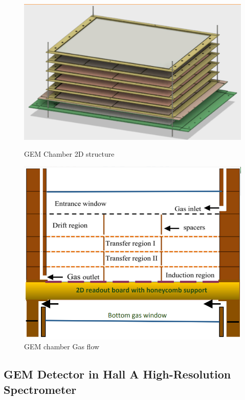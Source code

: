 \begin{figure}[!tbp]
  \centering
  \begin{minipage}[b]{0.45\textwidth}
    \includegraphics[width=\textwidth]{images/chap5/gem_structure_3d.png}
    \caption{GEM Chamber 2D structure}
  \end{minipage}
  \hfill
  \begin{minipage}[b]{0.45\textwidth}
    \includegraphics[width=\textwidth]{images/chap5/gem_structure_chamber_2d.png}
    \caption{GEM chamber Gas flow}
  \end{minipage}
\end{figure}


\subsection{GEM Detector in Hall A High-Resolution Spectrometer}

